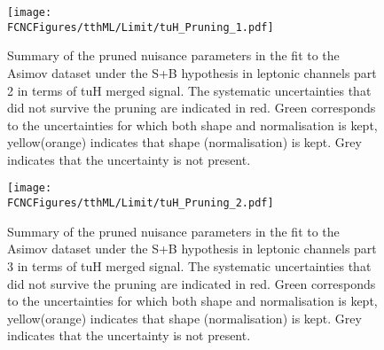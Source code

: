 \begin{figure}[H]
\centering
\texttt{[image: \\FCNCFigures/tthML/Limit/tuH\_Pruning\_1.pdf]}
\caption{ Summary of the pruned nuisance parameters in the fit to the  Asimov dataset under the S+B hypothesis in leptonic channels part 2 in terms of tuH merged signal. The systematic uncertainties that did not survive the pruning are indicated in red. Green corresponds to the uncertainties for which both shape and normalisation is kept, yellow(orange) indicates that shape (normalisation) is kept. Grey indicates that the uncertainty is not present. }
\label{fig:tthML_pruning_1}
\end{figure}

\begin{figure}[H]
\centering
\texttt{[image: \\FCNCFigures/tthML/Limit/tuH\_Pruning\_2.pdf]}
\caption{ Summary of the pruned nuisance parameters in the fit to the  Asimov dataset under the S+B hypothesis in leptonic channels part 3 in terms of tuH merged signal. The systematic uncertainties that did not survive the pruning are indicated in red. Green corresponds to the uncertainties for which both shape and normalisation is kept, yellow(orange) indicates that shape (normalisation) is kept. Grey indicates that the uncertainty is not present.}
\label{fig:tthML_pruning_2}
\end{figure}


